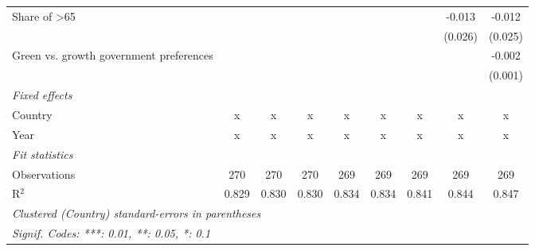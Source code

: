 \begin{table}[htbp]
\begin{tabular}{lcccccccc}
      Share of >65                            &         &         &         &         &         &         & -0.013  & -0.012\\   
                                              &         &         &         &         &         &         & (0.026) & (0.025)\\   
      Green vs. growth government preferences &         &         &         &         &         &         &         & -0.002\\   
                                              &         &         &         &         &         &         &         & (0.001)\\   
      \emph{Fixed effects}\\
      Country                                 & x       & x       & x       & x       & x       & x       & x       & x\\  
      Year                                    & x       & x       & x       & x       & x       & x       & x       & x\\  
      \midrule \emph{Fit statistics}\\
      Observations                            & 270     & 270     & 270     & 269     & 269     & 269     & 269     & 269\\  
      R$^2$                                   & 0.829   & 0.830   & 0.830   & 0.834   & 0.834   & 0.841   & 0.844   & 0.847\\  
      \midrule
      \multicolumn{9}{l}{\emph{Clustered (Country) standard-errors in parentheses}}\\
      \multicolumn{9}{l}{\emph{Signif. Codes: ***: 0.01, **: 0.05, *: 0.1}}\\
   \end{tabular}
\end{table}


